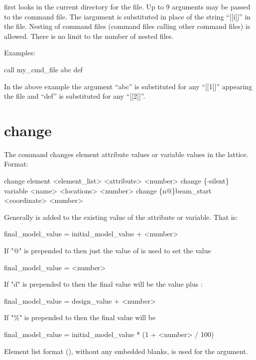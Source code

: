 \vskip 0.2in 
\tao first looks in the current directory for the file.
Up to 9 arguments may be passed to the command file. The i\Th argument
is substituted in place of the string ``[[i]]'' in the file. Nesting
of command files (command files calling other command files) is
allowed. There is no limit to the number of nested files.

Examples:
\begin{example}
    call my_cmd_file abc def 
\end{example}
In the above example the argument ``abc'' is substituted for any
``[[1]]'' appearing the file and ``def'' is substituted for any
``[[2]]''.
\Newline

\section{change}
\label{s:change}

The  command changes element attribute values or variable
values in the  lattice. Format:
\begin{example}
  change element <element_list> <attribute> <number>
  change \{-silent\} variable <name> <locations> <number>
  change  \{n@\}beam_start <coordinate> <number>
\end{example}

\vskip 0.2in 
Generally  is added to the existing value of the
attribute or variable. That is:
\begin{example}
  final_model_value = initial_model_value + <number>
\end{example}
If "@" is prepended to  then just the value of
 is used to set the value
\begin{example}
  final_model_value = <number>
\end{example}
If "d" is prepended to  then the final value will be the
 value plus :
\begin{example}
  final_model_value = design_value + <number>
\end{example}
If "\%" is prepended to  then the final value will be
\begin{example}
  final_model_value = initial_model_value * (1 + <number> / 100)
\end{example}

Element list format (), without any embedded
blanks, is used for the  argument.

